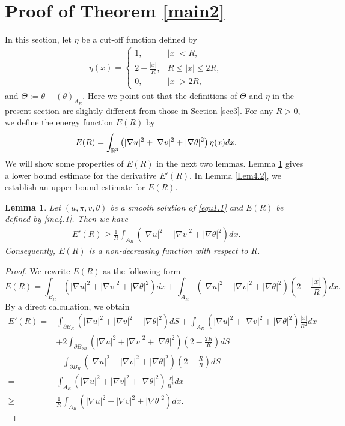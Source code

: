 \documentclass[11pt,reqno]{amsart}
\newtheorem{Lem}{Lemma}[section]
\numberwithin{Thm}{section}
\begin{document}
\section{Proof of Theorem \ref{main2}}\label{sec4}

In this section, let $\eta$ be a cut-off function defined by
\begin{align*}
	\eta(x)= \begin{cases}
		1, & |x| <R, \\
		2-\frac{|x|}{R},& R\leq |x|\leq 2R,\\
		0, & |x| >2R,
	\end{cases}
\end{align*}
and $\Theta:=\theta-(\theta)_{A_R}$. Here we point out that the definitions of $\Theta$ and $\eta$ in the present section are slightly different from those in Section \ref{sec3}.
For any $R>0$, we define the energy function $E(R)$ by
\begin{align}\label{ine4.1}
	\aligned
	E(R)=\int_{\mathbb{R}^3}\left(|\nabla u|^{2}+|\nabla v|^{2}+|\nabla \theta|^{2}\right)\eta(x)d x.
	\endaligned
\end{align}
We will show some properties of $E(R)$ in the next two lemmas. Lemma \ref{Lem4.1} gives a lower bound estimate for the derivative $E'(R)$.
In Lemma \ref{Lem4.2}, we establish an upper bound estimate for $E(R)$.
\begin{Lem}\label{Lem4.1}
	Let $(u,\pi,v,\theta)$ be a smooth solution of \eqref{equ1.1} and $E(R)$ be defined by \eqref{ine4.1}. Then we have
	\begin{align}\label{ine4.2}
		E'(R)\geq\frac{1}{R}\int_{A_R}\left(|\nabla u|^{2}+|\nabla v|^{2}+|\nabla \theta|^{2}\right)dx.
	\end{align}
Consequently, $E(R)$ is a non-decreasing function with respect to $R$.
\end{Lem}
\begin{proof}
	We rewrite $E(R)$ as the following form
	$$
	E(R)=\int_{B_R}\left(|\nabla u|^{2}+|\nabla v|^{2}+|\nabla \theta|^{2}\right) dx+\int_{A_R}\left(|\nabla u|^{2}+|\nabla v|^{2}+|\nabla \theta|^{2}\right)\left(2-\frac{|x|}{R}\right)dx.
	$$
	By a direct calculation, we obtain
	\begin{align*}
		E'(R)=&\int_{\partial B_R}\left(|\nabla u|^{2}+|\nabla v|^{2}+|\nabla \theta|^{2}\right) dS+\int_{A_R}\left(|\nabla u|^{2}+|\nabla v|^{2}+|\nabla \theta|^{2}\right)\frac{|x|}{R^2}dx\\
		&+2\int_{\partial B_{2R}}\left(|\nabla u|^{2}+|\nabla v|^{2}+|\nabla \theta|^{2}\right)\left(2-\frac{2R}{R}\right)dS\\
		&-\int_{\partial B_R}\left(|\nabla u|^{2}+|\nabla v|^{2}+|\nabla \theta|^{2}\right)\left(2-\frac{R}{R}\right)dS\\
		=&\int_{A_R}\left(|\nabla u|^{2}+|\nabla v|^{2}+|\nabla \theta|^{2}\right)\frac{|x|}{R^2}dx\\
		\geq&\frac{1}{R}\int_{A_R}\left(|\nabla u|^{2}+|\nabla v|^{2}+|\nabla \theta|^{2}\right)dx.
	\end{align*}
\end{proof}
\end{document}
